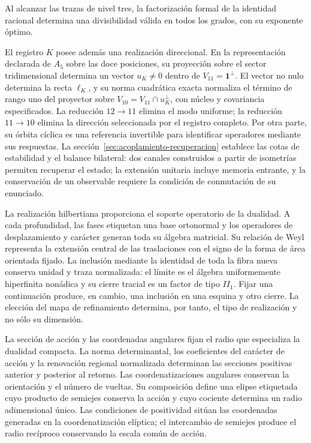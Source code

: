 Al alcanzar las trazas de nivel tres, la factorización formal
de la identidad racional determina una divisibilidad válida en todos
los grados, con su exponente óptimo.

El registro \(K\) posee además una realización direccional.
En la representación declarada de \(A_5\) sobre las doce posiciones,
su proyección sobre el sector tridimensional determina un vector
\(u_K\ne0\) dentro de \(V_{11}=\mathbf1^\perp\).
El vector no nulo determina la recta \(\ell_K\), y su norma cuadrática
exacta normaliza el término de rango uno del proyector sobre
\(V_{10}=V_{11}\cap u_K^\perp\), con núcleo y covariancia
especificados. La reducción \(12\to11\) elimina el modo uniforme;
la reducción \(11\to10\) elimina la dirección seleccionada por el
registro completo. Por otra parte, su órbita cíclica es una referencia
invertible para identificar operadores mediante sus respuestas.
La sección~\ref{sec:acoplamiento-recuperacion} establece las cotas
de estabilidad y el balance bilateral: dos canales construidos a partir de isometrías permiten
recuperar el estado; la extensión unitaria incluye memoria entrante,
y la conservación de un observable requiere la condición de conmutación
de su enunciado.

La realización hilbertiana proporciona el soporte operatorio de la
dualidad. A cada profundidad, las fases etiquetan una base ortonormal
y los operadores de desplazamiento y carácter generan toda su álgebra
matricial. Su relación de Weyl representa la extensión central de las
traslaciones con el signo de la forma de área orientada fijado.
La inclusión mediante la identidad de toda la fibra nueva conserva
unidad y traza normalizada: el límite es el álgebra uniformemente
hiperfinita nonádica y su cierre tracial es un factor de tipo \(II_1\).
Fijar una continuación produce, en cambio, una inclusión en una esquina
y otro cierre. La elección del mapa de refinamiento determina, por
tanto, el tipo de realización y no sólo su dimensión.

La sección de acción y las coordenadas angulares fijan el radio que
especializa la dualidad compacta. La norma determinantal, los
coeficientes del carácter de acción y la renovación regional normalizada
determinan las secciones positivas anterior y posterior al retorno.
Las coordenatizaciones angulares conservan la orientación y el número de vueltas.
Su composición define una elipse etiquetada cuyo producto de semiejes
conserva la acción y cuyo cociente determina un radio adimensional
único. Las condiciones de positividad sitúan las coordenadas generadas
en la coordenatización elíptica; el intercambio de semiejes produce el radio
recíproco conservando la escala común de acción.

